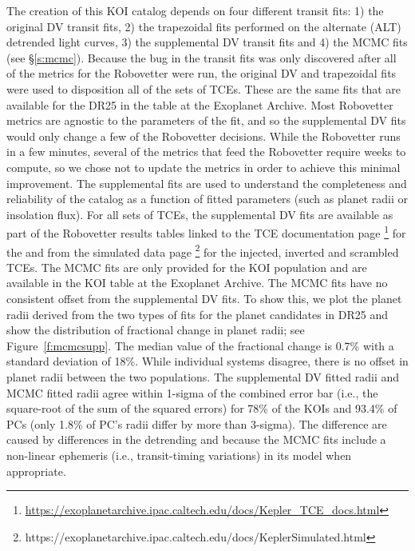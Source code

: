 The creation of this KOI catalog depends on four different transit fits: 1) the original DV transit fits, 2) the trapezoidal fits performed on the alternate (ALT) \citet{Garcia2010} detrended light curves, 3) the supplemental DV transit fits and 4) the MCMC fits (see \S\ref{s:mcmc}).  Because the bug in the transit fits was only discovered after all of the metrics for the Robovetter were run, the original DV and trapezoidal fits were used to disposition all of the sets of TCEs. These are the same fits that are available for the DR25  in the table at the Exoplanet Archive. Most Robovetter metrics are agnostic to the parameters of the fit, and so the supplemental DV fits would only change a few of the Robovetter decisions. While the Robovetter runs in a few minutes, several of the metrics that feed the Robovetter require weeks to compute, so we chose not to update the metrics in order to achieve this minimal improvement. The supplemental fits are used to understand the completeness and reliability of the catalog as a function of fitted parameters (such as planet radii or insolation flux).  For all sets of TCEs, the supplemental DV fits are available as part of the Robovetter results tables linked to the TCE documentation page \footnote{\url{https://exoplanetarchive.ipac.caltech.edu/docs/Kepler\_TCE\_docs.html}} for the  and from the simulated data page \footnote{https://exoplanetarchive.ipac.caltech.edu/docs/KeplerSimulated.html}  \citep[see][]{Christiansen2017,Coughlin2017a} for the injected, inverted and scrambled TCEs. The MCMC fits are only provided for the KOI population and are available in the KOI table at the Exoplanet Archive. The MCMC fits have no consistent offset from the supplemental DV fits.  To show this, we plot the planet radii derived from the two types of fits for the planet candidates in DR25 and show the distribution of fractional change in planet radii; see Figure~\ref{f:mcmcsupp}. The median value of the fractional change is 0.7\% with a standard deviation of 18\%. While individual systems disagree, there is no offset in planet radii between the two populations. The supplemental DV fitted radii and MCMC fitted radii agree within 1-sigma of the combined error bar (i.e., the square-root of the sum of the squared errors) for 78\% of the KOIs and 93.4\% of PCs (only 1.8\% of PC's radii differ by more than 3-sigma).  The difference are caused by differences in the detrending and because the MCMC fits include a non-linear ephemeris (i.e., transit-timing variations) in its model when appropriate.

